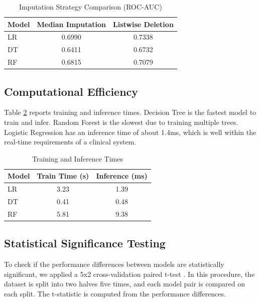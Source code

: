 \documentclass[conference]{IEEEtran}
\begin{document}
\begin{table}[htbp]
\caption{Imputation Strategy Comparison (ROC-AUC)}
\begin{center}
\begin{tabular}{lcc}
\toprule
\textbf{Model} & \textbf{Median Imputation} & \textbf{Listwise Deletion} \\
\midrule
LR & 0.6990 & 0.7338 \\
DT & 0.6411 & 0.6732 \\
RF & 0.6815 & 0.7079 \\
\bottomrule
\end{tabular}
\label{tab:imputation}
\end{center}
\end{table}

\subsection{Computational Efficiency}

Table \ref{tab:timing} reports training and inference times. Decision Tree is the fastest model to train and infer. Random Forest is the slowest due to training multiple trees. Logistic Regression has an inference time of about 1.4ms, which is well within the real-time requirements of a clinical system.

\begin{table}[htbp]
\caption{Training and Inference Times}
\begin{center}
\begin{tabular}{lcc}
\toprule
\textbf{Model} & \textbf{Train Time (s)} & \textbf{Inference (ms)} \\
\midrule
LR & 3.23 & 1.39 \\
DT & 0.41 & 0.48 \\
RF & 5.81 & 9.38 \\
\bottomrule
\end{tabular}
\label{tab:timing}
\end{center}
\end{table}

\subsection{Statistical Significance Testing}

To check if the performance differences between models are statistically significant, we applied a 5x2 cross-validation paired t-test \cite{b5}. In this procedure, the dataset is split into two halves five times, and each model pair is compared on each split. The t-statistic is computed from the performance differences.
\end{document}
